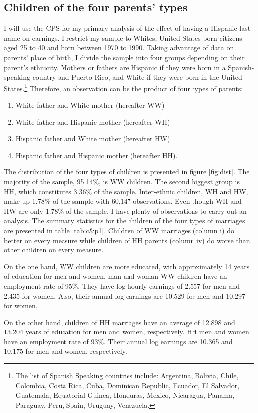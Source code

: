 \documentclass[12pt, fullpage]{article}
\begin{document}
\subsection{Children of the four parents' types}
I will use the CPS for my primary analysis of the effect of having a Hispanic last name on earnings. I restrict my sample to Whites, United States-born citizens aged 25 to 40 and born between 1970 to 1990. Taking advantage of data on parents' place of birth, I divide the sample into four groups depending on their parent's ethnicity. Mothers or fathers are Hispanic if they were born in a Spanish-speaking country and Puerto Rico, and White if they were born in the United States.\footnote{The list of Spanish Speaking countries include: Argentina, Bolivia, Chile, Colombia, Costa Rica, Cuba, Dominican Republic, Ecuador, El Salvador, Guatemala, Equatorial Guinea, Honduras, Mexico, Nicaragua, Panama, Paraguay, Peru, Spain, Uruguay, Venezuela.} Therefore, an observation can be the product of four types of parents: 
\begin{enumerate}
\item White father and White mother (hereafter WW) 
\item White father and Hispanic mother (hereafter WH)
\item Hispanic father and White mother (hereafter HW)
\item Hispanic father and Hispanic mother (hereafter HH).
\end{enumerate}
The distribution of the four types of children is presented in figure \ref{fig:dist}. The majority of the sample, 95.14\%, is WW children. The second biggest group is HH, which constitutes 3.36\% of the sample. Inter-ethnic children, WH and HW, make up 1.78\% of the sample with 60,147 observations. Even though WH and HW are only 1.78\% of the sample, I have plenty of observations to carry out an analysis. The summary statistics for the children of the four types of marriages are presented in table \ref{tab:c&p1}. Children of WW marriages (column i) do better on every measure while children of HH parents (column iv) do worse than other children on every measure. 

On the one hand, WW children are more educated, with approximately 14 years of education for men and women. man and woman WW children have an employment rate of 95\%. They have log hourly earnings of 2.557 for men and 2.435 for women. Also, their annual log earnings are 10.529 for men and 10.297 for women.

On the other hand, children of HH marriages have an average of 12.898 and 13.204 years of education for men and women, respectively. HH men and women have an employment rate of 93\%. Their annual log earnings are 10.365 and 10.175 for men and women, respectively. 
\end{document}
